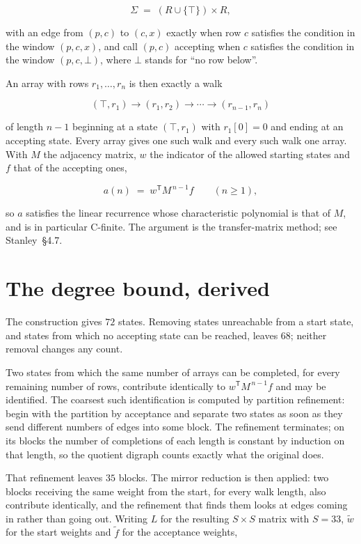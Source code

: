 \documentclass[11pt]{article}
\theoremstyle{definition}
\begin{document}
\[\Sigma \;=\; (R \cup \{\top\}) \times R,\]

with an edge from $(p,c)$ to $(c,x)$ exactly when row $c$ satisfies the condition in the window $(p,c,x)$, and call $(p,c)$ accepting when $c$ satisfies the condition in the window $(p,c,\bot)$, where $\bot$ stands for ``no row below''.

An array with rows $r_1,\dots,r_n$ is then exactly a walk

\[(\top,r_1) \to (r_1,r_2) \to \cdots \to (r_{n-1},r_n)\]

of length $n-1$ beginning at a state $(\top,r_1)$ with $r_1[0]=0$ and ending at an accepting state. Every array gives one such walk and every such walk one array. With $M$ the adjacency matrix, $w$ the indicator of the allowed starting states and $f$ that of the accepting ones,

\[a(n) \;=\; w^{\mathsf T} M^{\,n-1} f \qquad (n \ge 1),\]

so $a$ satisfies the linear recurrence whose characteristic polynomial is that of $M$, and is in particular C-finite. The argument is the transfer-matrix method; see Stanley~\S4.7.

\section{The degree bound, derived}

The construction gives $72$ states. Removing states unreachable from a start state, and states from which no accepting state can be reached, leaves $68$; neither removal changes any count.

Two states from which the same number of arrays can be completed, for every remaining number of rows, contribute identically to $w^{\mathsf T}M^{\,n-1}f$ and may be identified. The coarsest such identification is computed by partition refinement: begin with the partition by acceptance and separate two states as soon as they send different numbers of edges into some block. The refinement terminates; on its blocks the number of completions of each length is constant by induction on that length, so the quotient digraph counts exactly what the original does.

That refinement leaves $35$ blocks. The mirror reduction is then applied: two blocks receiving the same weight from the start, for every walk length, also contribute identically, and the refinement that finds them looks at edges coming in rather than going out. Writing $L$ for the resulting $S \times S$ matrix with $S = 33$, $\tilde w$ for the start weights and $\tilde f$ for the acceptance weights,
\end{document}
